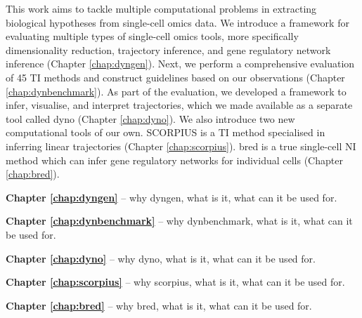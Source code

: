
This work aims to tackle multiple computational problems in extracting biological hypotheses from single-cell omics data. 
We introduce a framework for evaluating multiple types of single-cell omics tools, more specifically dimensionality reduction, trajectory inference, and gene regulatory network inference (Chapter \ref{chap:dyngen}). Next, we perform a comprehensive evaluation of 45 TI methods and construct guidelines based on our observations (Chapter \ref{chap:dynbenchmark}). As part of the evaluation, we developed a framework to infer, visualise, and interpret trajectories, which we made available as a separate tool called dyno (Chapter \ref{chap:dyno}).
We also introduce two new computational tools of our own. SCORPIUS is a TI method specialised in inferring linear trajectories (Chapter \ref{chap:scorpius}). bred is a true single-cell NI method which can infer gene regulatory networks for individual cells (Chapter \ref{chap:bred}).



\textbf{Chapter \ref{chap:dyngen}} -- why dyngen, what is it, what can it be used for.

\textbf{Chapter \ref{chap:dynbenchmark}} -- why dynbenchmark, what is it, what can it be used for.

\textbf{Chapter \ref{chap:dyno}} -- why dyno, what is it, what can it be used for.

\textbf{Chapter \ref{chap:scorpius}} -- why scorpius, what is it, what can it be used for.

\textbf{Chapter \ref{chap:bred}} -- why bred, what is it, what can it be used for.



%


